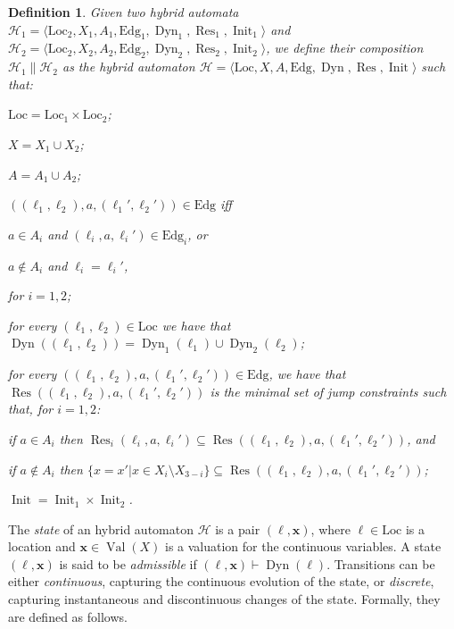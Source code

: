 \documentclass[submission,copyright,creativecommons]{eptcs}
\newcommand{\cmodels}{\vdash}
\newtheorem{definition}{Definition}
\newcommand{\autH}{\mathcal{H}}
\newcommand{\Loc}{\mathrm{Loc}}
\newcommand{\Edg}{\mathrm{Edg}}
\DeclareMathOperator{\Dyn}{{Dyn}}
\DeclareMathOperator{\Res}{{Res}}
\DeclareMathOperator{\Init}{{Init}}
\DeclareMathOperator{\Val}{{Val}}
\newcommand{\bx}{\mathbf{x}}
\begin{document}
\begin{definition}\label{def:ha-composition}
	Given two hybrid automata $\autH_1 = \langle\Loc_2,X_1,A_1,\Edg_1,\Dyn_1,\Res_1,\Init_1\rangle$ and \linebreak $\autH_2 = \langle\Loc_2,X_2,A_2,\Edg_2,\Dyn_2,\Res_2,\Init_2\rangle$, we define their composition $\autH_1 \| \autH_2$ as the hybrid automaton $\autH = \langle\Loc,X,A,\Edg,\Dyn,\Res,\Init\rangle$ such that:
\begin{compactenum}
	\item $\Loc = \Loc_1 \times \Loc_2$;

	\item $X = X_1 \cup X_2$;

	\item $A = A_1 \cup A_2$;

	\item $((\ell_1,\ell_2),a,(\ell_1',\ell_2')) \in \Edg$ iff
		\begin{inparaenum}[\it (i)]
			\item $a \in A_i$ and $(\ell_i, a, \ell_i') \in \Edg_i$, or
			\item $a \not\in A_i$ and $\ell_i = \ell_i'$,
		\end{inparaenum}
		for $i = 1,2$;

	\item 	for every $(\ell_1,\ell_2) \in \Loc$ we have that $\Dyn((\ell_1,\ell_2)) = \Dyn_1(\ell_1) \cup \Dyn_2(\ell_2)$;


	\item for every $((\ell_1,\ell_2),a,(\ell_1',\ell_2'))\in\Edg$, we have that $\Res((\ell_1,\ell_2),a,(\ell_1',\ell_2'))$ is 
		the minimal set of jump constraints such that, for $i = 1,2$:
		\begin{compactenum}[\it (i)]
			\item if $a \in A_i$ then $\Res_i(\ell_i,a,\ell_i')\subseteq\Res((\ell_1,\ell_2),a,(\ell_1',\ell_2'))$, and
			\item if $a \not\in A_i$ then $\{x = x' | x \in X_i \setminus X_{3-i}\}\subseteq\Res((\ell_1,\ell_2),a,(\ell_1',\ell_2'))$;
		\end{compactenum}
	\item $\Init = \Init_1 \times \Init_2$.
\end{compactenum}
\end{definition}


The \emph{state} of an hybrid automaton $\autH$ is a pair $(\ell,\bx)$, where $\ell\in \Loc$
is a location and $\bx \in \Val(X)$ is a valuation for the continuous variables.
A state $(\ell,\bx)$ is said to be \emph{admissible} if $(\ell,\bx) \cmodels \Dyn(\ell)$.
Transitions can be either \emph{continuous}, capturing the continuous evolution of the state, or 
\emph{discrete}, capturing instantaneous and discontinuous changes of the state.
Formally, they are defined as follows.
\end{document}
